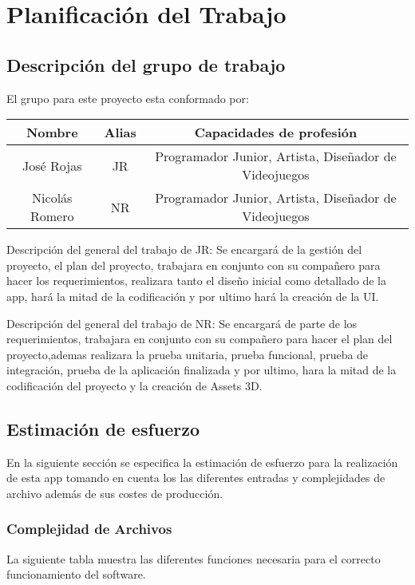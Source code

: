 \section{Planificación del Trabajo}

\subsection{Descripción del grupo de trabajo}
El grupo para este proyecto esta conformado por:

\begin{tabular}{|c|c|c|}
\hline 
Nombre & Alias & Capacidades de profesión \\ 
\hline 
José Rojas & JR & Programador Junior, Artista, Diseñador de Videojuegos \\ 
\hline 
Nicolás Romero & NR & Programador Junior, Artista, Diseñador de Videojuegos \\ 
\hline 
\end{tabular} 

Descripción del general del trabajo de JR: Se encargará de la gestión del proyecto, el
plan del proyecto, trabajara en conjunto con su compañero para hacer los requerimientos,
realizara tanto el diseño inicial como detallado de la app, hará la mitad de la codificación y por ultimo hará la creación de la UI.

Descripción del general del trabajo de NR: Se encargará de parte de los requerimientos,
trabajara en conjunto con su compañero para hacer el plan del proyecto,ademas realizara la
prueba unitaria, prueba funcional, prueba de integración, prueba de la aplicación finalizada
y por ultimo, hara la mitad de la codificación del proyecto y la creación de Assets 3D.


\subsection{Estimación de esfuerzo}
En la siguiente sección se especifica la estimación de esfuerzo para la realización de esta app tomando en cuenta los las diferentes entradas y complejidades de archivo además de sus costes de producción.

\subsubsection{Complejidad de Archivos}
La siguiente tabla muestra las diferentes funciones necesaria para el correcto funcionamiento del software.

